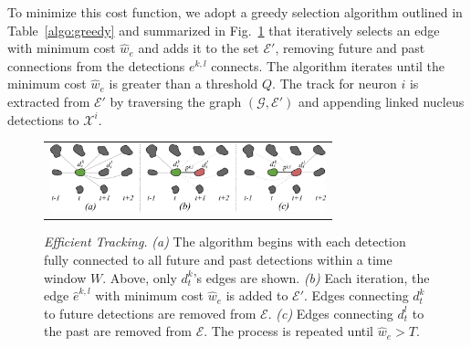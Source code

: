 To minimize this  cost function, we adopt a  greedy selection algorithm outlined
in Table~\ref{algo:greedy} and  summarized in Fig.~\ref{fig:greedytracking} that
iteratively selects an edge with minimum cost  $\hat w_e$ and adds it to the set
$\mathcal{E}'$,  removing  future  and  past  connections  from  the  detections
$e^{k,l}$ connects. The algorithm iterates  until the minimum cost $\hat w_e$ is
greater  than a  threshold  $Q$. The  track  for neuron  $i$  is extracted  from
$\mathcal{E}'$   by  traversing   the  graph   $(\mathcal{G},\mathcal{E}')$  and
appending linked nucleus detections to $\mathcal{X}^i$.




\begin{figure}[t]
  \centering
       \begin{tabular}{c}
        \includegraphics[width = 80mm] {images/greedytracking.pdf}\\ [-2.4ex]
       \end{tabular} 
    \caption{  {\footnotesize {\it Efficient Tracking.}  {\em  (a)} The algorithm begins with each
        detection fully connected to all future and past detections
        within  a time  window  $W$.  Above, only  $d^k_t$'s edges  are
        shown. {\em  (b)} Each iteration,  the edge $\hat{e}^{k,l}$
        with   minimum  cost   $\hat{w}_e$  is  added  to $\mathcal{E}'$.   Edges  connecting
        $d^k_t$ to  future detections are  removed from $\mathcal{E}$.
        {\em  (c)} Edges  connecting  $d^l_t$ to  the past  are
        removed from $\mathcal{E}$.  The process is repeated until $\hat w_e > T$. }}
    \label{fig:greedytracking}
  
\vspace{-7mm}
\end{figure}


